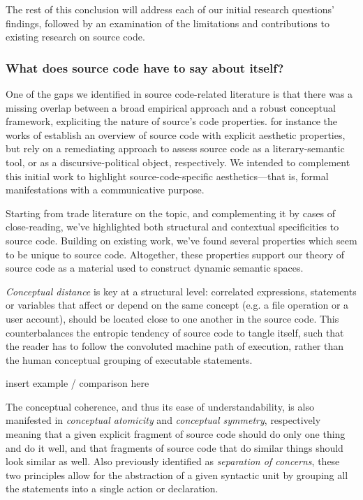 The rest of this conclusion will address each of our initial research questions' findings, followed by an examination of the limitations and contributions to existing research on source code.

\subsubsection{What does source code have to say about itself?} %

One of the gaps we identified in source code-related literature is that there was a missing overlap between a broad empirical approach and a robust conceptual framework, expliciting the nature of source's code properties. for instance the works of \citep{paloque-berges_poetique_2009,cox_speaking_2013} establish an overview of source code with explicit aesthetic properties, but rely on a remediating approach to assess source code as a literary-semantic tool, or as a discursive-political object, respectively. We intended to complement this initial work to highlight source-code-specific aesthetics—that is, formal manifestations with a communicative purpose.

Starting from trade literature on the topic, and complementing it by cases of close-reading, we've highlighted both structural and contextual specificities to source code. Building on existing work, we've found several properties which seem to be unique to source code. Altogether, these properties support our theory of source code as a material used to construct dynamic semantic spaces.

\emph{Conceptual distance} is key at a structural level: correlated expressions, statements or variables that affect or depend on the same concept (e.g. a file operation or a user account), should be located close to one another in the source code. This counterbalances the entropic tendency of source code to tangle itself, such that the reader has to follow the convoluted machine path of execution, rather than the human conceptual grouping of executable statements.

\begin{listing}
    insert example / comparison here
\end{listing}

The conceptual coherence, and thus its ease of understandability, is also manifested in \emph{conceptual atomicity} and \emph{conceptual symmetry}, respectively meaning that a given explicit fragment of source code should do only one thing and do it well, and that fragments of source code that do similar things should look similar as well. Also previously identified as \emph{separation of concerns}, these two principles allow for the abstraction of a given syntactic unit by grouping all the statements into a single action or declaration.

